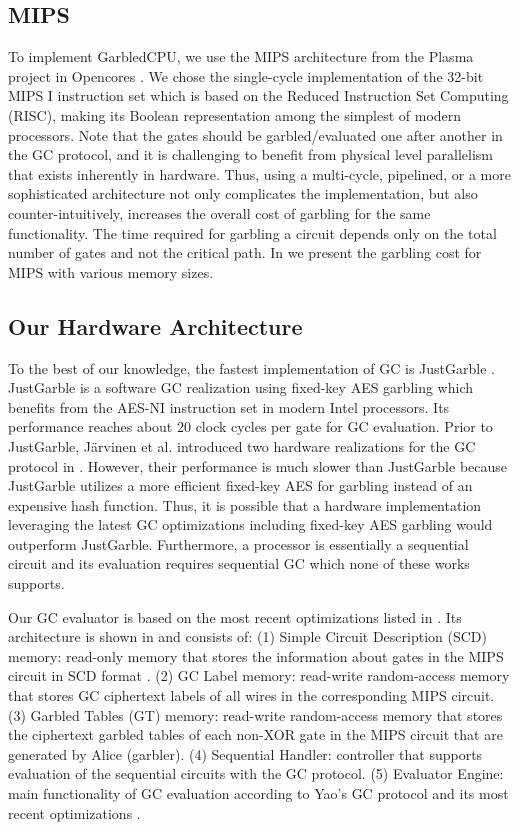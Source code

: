 \subsection{MIPS}
To implement GarbledCPU, we use the MIPS architecture from the Plasma project in Opencores \cite{rhoads2006plasma}. We chose the single-cycle implementation of the 32-bit MIPS I instruction set which is based on the Reduced Instruction Set Computing (RISC), making its Boolean representation among the simplest of modern processors. Note that the gates should be garbled/evaluated one after another in the GC protocol, and it is challenging to benefit from physical level parallelism that exists inherently in hardware. Thus, using a multi-cycle, pipelined, or a more sophisticated architecture not only complicates the implementation, but also counter-intuitively, increases the overall cost of garbling for the same functionality. The time required for garbling a circuit depends only on the total number of gates and not the critical path. In  we present the garbling cost for MIPS with various memory sizes.

\subsection{Our Hardware Architecture}\label{ssect:hwimp}
To the best of our knowledge, the fastest implementation of GC is JustGarble \cite{bellare2013efficient}. JustGarble is a software GC realization using fixed-key AES garbling which benefits from the AES-NI instruction set in modern Intel processors. Its performance reaches about $20$ clock cycles per gate for GC evaluation. Prior to JustGarble, J\"arvinen et al. introduced two hardware realizations for the GC protocol in \cite{jarvinen2010garbled}. However, their performance is much slower than JustGarble because JustGarble utilizes a more efficient fixed-key AES for garbling instead of an expensive hash function. Thus, it is possible that a hardware implementation leveraging the latest GC optimizations including fixed-key AES garbling would outperform JustGarble. Furthermore, a processor is essentially a sequential circuit and its evaluation requires sequential GC which none of these works supports.

Our GC evaluator is based on the most recent optimizations listed in . Its architecture is shown in  and consists of:
(1) Simple Circuit Description (SCD) memory: read-only memory that stores the information about gates in the MIPS circuit in SCD format \cite{bellare2013efficient, songhori2015tinygarble}.
(2) GC Label memory: read-write random-access memory that stores GC ciphertext labels of all wires in the corresponding MIPS circuit.
(3) Garbled Tables (GT) memory: read-write random-access memory that stores the ciphertext garbled tables of each non-XOR gate in the MIPS circuit that are generated by Alice (garbler).
(4) Sequential Handler: controller that supports evaluation of the sequential circuits with the GC protocol.
(5) Evaluator Engine: main functionality of GC evaluation according to Yao's GC protocol and its most recent optimizations \cite{kolesnikov2008improved, bellare2013efficient, zahur2015two,songhori2015tinygarble}.

